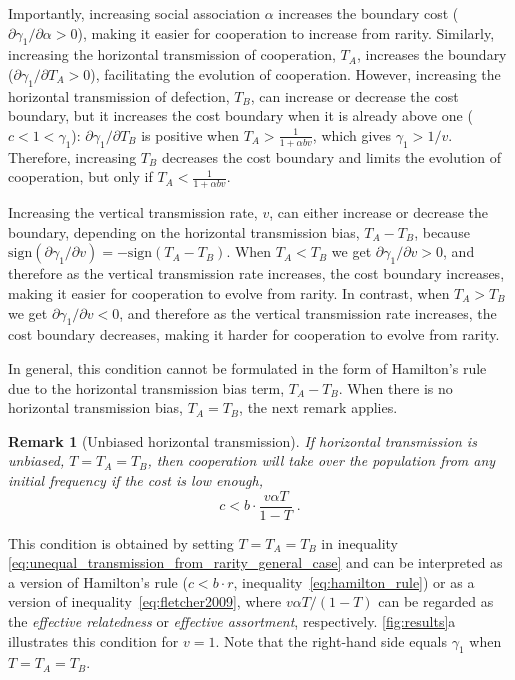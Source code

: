\documentclass[12pt]{extarticle}
\newtheorem{remark}{Remark}
\begin{document}
Importantly, increasing social association $\alpha$ increases the boundary cost ($\partial \gamma_1 / \partial \alpha > 0$), making it easier for cooperation to increase from rarity.
Similarly, increasing the horizontal transmission of cooperation, $T_A$, increases the boundary ($\partial \gamma_1 / \partial T_A > 0$), facilitating the evolution of cooperation.
However, increasing the horizontal transmission of defection, $T_B$, can increase or decrease the cost boundary, but it increases the cost boundary when it is already above one ($c<1<\gamma_1$): $\partial\gamma_1/\partial T_B$ is positive when $T_A > \frac{1}{1+\alpha b v}$, which gives $\gamma_1>1/v$. 
Therefore, increasing $T_B$ decreases the cost boundary and limits the evolution of cooperation, but only if $T_A < \frac{1}{1+\alpha b v}$.

Increasing the vertical transmission rate, $v$, can either increase or decrease the boundary, depending on the horizontal transmission bias, $T_A-T_B$, because $\text{sign}(\partial \gamma_1 / \partial v) = -\text{sign}(T_A-T_B)$.
When $T_A<T_B$ we get $\partial \gamma_1 / \partial v >0$, and therefore as the vertical transmission rate increases, the cost boundary increases, making it easier for cooperation to evolve from rarity. 
In contrast, when $T_A > T_B$ we get $\partial \gamma_1 / \partial v <0$, and therefore as the vertical transmission rate increases, the cost boundary decreases, making it harder for cooperation to evolve from rarity.

In general, this condition cannot be formulated in the form of Hamilton's rule due to the horizontal transmission bias term, $T_A-T_B$.
When there is no horizontal transmission bias, $T_A=T_B$, the next remark applies.
\\

\begin{remark}[Unbiased horizontal transmission] 
\label{remark:equal_transmission}
If horizontal transmission is unbiased, $T=T_A=T_B$, then cooperation will take over the population from any initial frequency if the cost is low enough,
\begin{equation}
\label{eq:equal_transmission}
c < b \cdot \frac{v \alpha T}{1-T} \;.
\end{equation}
\end{remark}
This condition is obtained by setting $T=T_A=T_B$ in inequality \ref{eq:unequal_transmission_from_rarity_general_case} and can be interpreted as a version of Hamilton's rule  ($c<b\cdot r$, inequality~\ref{eq:hamilton_rule}) or as a version of inequality~\ref{eq:fletcher2009}, where $v \alpha T/(1-T)$ can be regarded as the \emph{effective relatedness} or \emph{effective assortment}, respectively.
\autoref{fig:results}a illustrates this condition for $v=1$. Note that the right-hand side equals $\gamma_1$ when $T=T_A=T_B$.
\end{document}
